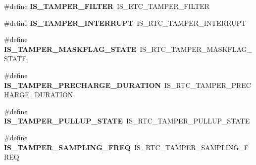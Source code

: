 \begin{DoxyCompactItemize}
\item 
\hypertarget{group___h_a_l___r_t_c___aliased___macros_ga96d532a9a8a0b283f2fd289355001233}{\#define {\bfseries I\-S\-\_\-\-T\-A\-M\-P\-E\-R\-\_\-\-F\-I\-L\-T\-E\-R}~I\-S\-\_\-\-R\-T\-C\-\_\-\-T\-A\-M\-P\-E\-R\-\_\-\-F\-I\-L\-T\-E\-R}\label{group___h_a_l___r_t_c___aliased___macros_ga96d532a9a8a0b283f2fd289355001233}

\item 
\hypertarget{group___h_a_l___r_t_c___aliased___macros_gaa441c6cceeee673784fd5f9dcd1a0334}{\#define {\bfseries I\-S\-\_\-\-T\-A\-M\-P\-E\-R\-\_\-\-I\-N\-T\-E\-R\-R\-U\-P\-T}~I\-S\-\_\-\-R\-T\-C\-\_\-\-T\-A\-M\-P\-E\-R\-\_\-\-I\-N\-T\-E\-R\-R\-U\-P\-T}\label{group___h_a_l___r_t_c___aliased___macros_gaa441c6cceeee673784fd5f9dcd1a0334}

\item 
\hypertarget{group___h_a_l___r_t_c___aliased___macros_ga936b760d07038d51cd9a72f1f0456711}{\#define {\bfseries I\-S\-\_\-\-T\-A\-M\-P\-E\-R\-\_\-\-M\-A\-S\-K\-F\-L\-A\-G\-\_\-\-S\-T\-A\-T\-E}~I\-S\-\_\-\-R\-T\-C\-\_\-\-T\-A\-M\-P\-E\-R\-\_\-\-M\-A\-S\-K\-F\-L\-A\-G\-\_\-\-S\-T\-A\-T\-E}\label{group___h_a_l___r_t_c___aliased___macros_ga936b760d07038d51cd9a72f1f0456711}

\item 
\hypertarget{group___h_a_l___r_t_c___aliased___macros_gacaaf7b6159a85289691dea9b0d3a6195}{\#define {\bfseries I\-S\-\_\-\-T\-A\-M\-P\-E\-R\-\_\-\-P\-R\-E\-C\-H\-A\-R\-G\-E\-\_\-\-D\-U\-R\-A\-T\-I\-O\-N}~I\-S\-\_\-\-R\-T\-C\-\_\-\-T\-A\-M\-P\-E\-R\-\_\-\-P\-R\-E\-C\-H\-A\-R\-G\-E\-\_\-\-D\-U\-R\-A\-T\-I\-O\-N}\label{group___h_a_l___r_t_c___aliased___macros_gacaaf7b6159a85289691dea9b0d3a6195}

\item 
\hypertarget{group___h_a_l___r_t_c___aliased___macros_gaf061929111a6987f8a74e09e239d686b}{\#define {\bfseries I\-S\-\_\-\-T\-A\-M\-P\-E\-R\-\_\-\-P\-U\-L\-L\-U\-P\-\_\-\-S\-T\-A\-T\-E}~I\-S\-\_\-\-R\-T\-C\-\_\-\-T\-A\-M\-P\-E\-R\-\_\-\-P\-U\-L\-L\-U\-P\-\_\-\-S\-T\-A\-T\-E}\label{group___h_a_l___r_t_c___aliased___macros_gaf061929111a6987f8a74e09e239d686b}

\item 
\hypertarget{group___h_a_l___r_t_c___aliased___macros_ga534eeb558f5ddd78594acc82dbc56b9d}{\#define {\bfseries I\-S\-\_\-\-T\-A\-M\-P\-E\-R\-\_\-\-S\-A\-M\-P\-L\-I\-N\-G\-\_\-\-F\-R\-E\-Q}~I\-S\-\_\-\-R\-T\-C\-\_\-\-T\-A\-M\-P\-E\-R\-\_\-\-S\-A\-M\-P\-L\-I\-N\-G\-\_\-\-F\-R\-E\-Q}\label{group___h_a_l___r_t_c___aliased___macros_ga534eeb558f5ddd78594acc82dbc56b9d}


\end{DoxyCompactItemize}
